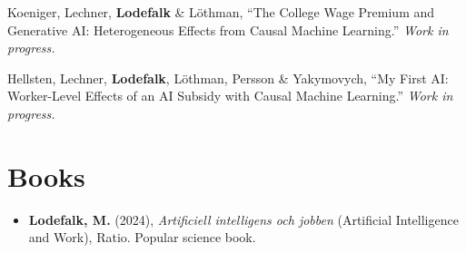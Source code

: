 \documentclass[11pt,a4paper]{article}
\newcommand{\name}[1]{\textbf{#1}}
\newcommand{\cventry}[1]{\item #1}
\newcommand{\publication}[1]{\item #1}
\begin{document}
\begin{enumerate}[label={[\arabic*]}]
\publication{Koeniger, Lechner, \name{Lodefalk} \& Löthman, ``The College Wage Premium and Generative AI: Heterogeneous Effects from Causal Machine Learning.'' \textit{Work in progress.}} %

\publication{Hellsten, Lechner, \name{Lodefalk}, Löthman, Persson \& Yakymovych, ``My First AI: Worker-Level Effects of an AI Subsidy with Causal Machine Learning.'' \textit{Work in progress.}} %

\end{enumerate}

\section{Books}
\vspace{-2pt}
\begin{itemize}
\cventry{\name{Lodefalk, M.} (2024), \textit{Artificiell intelligens och jobben} (Artificial Intelligence and Work), Ratio. Popular science book.}
\end{itemize}

\end{document}
